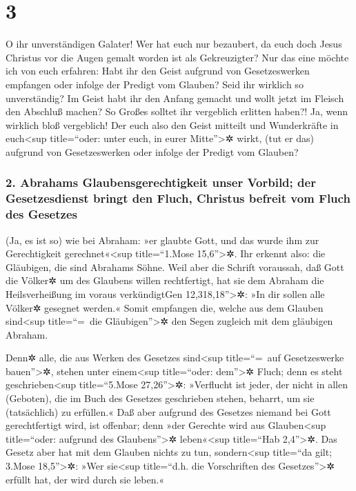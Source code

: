 \hypertarget{section-2}{%
\section{3}\label{section-2}}

 O ihr unverständigen Galater! Wer hat euch nur bezaubert,
da euch doch Jesus Christus vor die Augen gemalt worden ist als
Gekreuzigter?  Nur das eine möchte ich von euch erfahren:
Habt ihr den Geist aufgrund von Gesetzeswerken empfangen oder infolge
der Predigt vom Glauben?  Seid ihr wirklich so
unverständig? Im Geist habt ihr den Anfang gemacht und wollt jetzt im
Fleisch den Abschluß machen?  So Großes solltet ihr
vergeblich erlitten haben?! Ja, wenn wirklich bloß vergeblich!
 Der euch also den Geist mitteilt und Wunderkräfte in
euch\textless sup title=``oder: unter euch, in eurer
Mitte''\textgreater✲ wirkt, (tut er das) aufgrund von Gesetzeswerken
oder infolge der Predigt vom Glauben?

\hypertarget{abrahams-glaubensgerechtigkeit-unser-vorbild-der-gesetzesdienst-bringt-den-fluch-christus-befreit-vom-fluch-des-gesetzes}{%
\subsubsection{2. Abrahams Glaubensgerechtigkeit unser Vorbild; der
Gesetzesdienst bringt den Fluch, Christus befreit vom Fluch des
Gesetzes}\label{abrahams-glaubensgerechtigkeit-unser-vorbild-der-gesetzesdienst-bringt-den-fluch-christus-befreit-vom-fluch-des-gesetzes}}

 (Ja, es ist so) wie bei Abraham: »er glaubte Gott, und
das wurde ihm zur Gerechtigkeit gerechnet«\textless sup title=``1.Mose
15,6''\textgreater✲.  Ihr erkennt also: die Gläubigen, die
sind Abrahams Söhne.  Weil aber die Schrift voraussah, daß
Gott die Völker✲ um des Glaubens willen rechtfertigt, hat sie dem
Abraham die Heilsverheißung im voraus verkündigtGen
12,318,18''\textgreater✲: »In dir sollen alle Völker✲ gesegnet werden.«
 Somit empfangen die, welche aus dem Glauben
sind\textless sup title=``=~die Gläubigen''\textgreater✲ den Segen
zugleich mit dem gläubigen Abraham.

 Denn✲ alle, die aus Werken des Gesetzes
sind\textless sup title=``=~auf Gesetzeswerke bauen''\textgreater✲,
stehen unter einem\textless sup title=``oder: dem''\textgreater✲ Fluch;
denn es steht geschrieben\textless sup title=``5.Mose
27,26''\textgreater✲: »Verflucht ist jeder, der nicht in allen
(Geboten), die im Buch des Gesetzes geschrieben stehen, beharrt, um sie
(tatsächlich) zu erfüllen.«  Daß aber aufgrund des
Gesetzes niemand bei Gott gerechtfertigt wird, ist offenbar; denn »der
Gerechte wird aus Glauben\textless sup title=``oder: aufgrund des
Glaubens''\textgreater✲ leben«\textless sup title=``Hab
2,4''\textgreater✲.  Das Gesetz aber hat mit dem Glauben
nichts zu tun, sondern\textless sup title=``da gilt; 3.Mose
18,5''\textgreater✲: »Wer sie\textless sup title=``d.h. die Vorschriften
des Gesetzes''\textgreater✲ erfüllt hat, der wird durch sie leben.«

